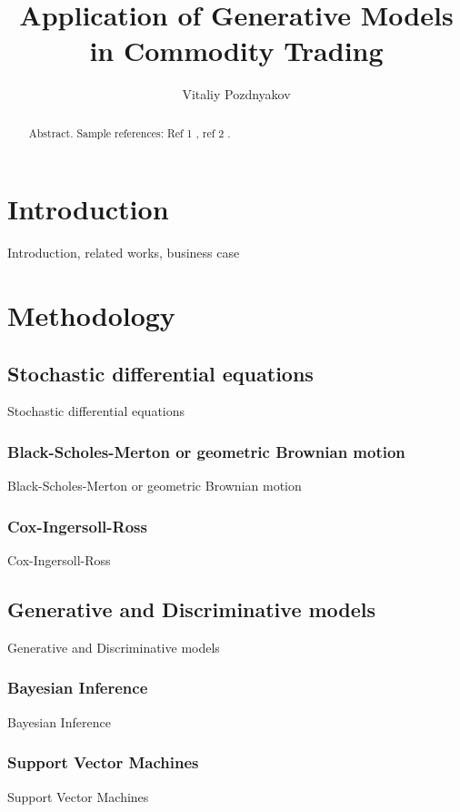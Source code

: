 \documentclass{article}
\title{Application of Generative Models \\ in Commodity Trading}
\author{Vitaliy Pozdnyakov}
\date{}
\begin{document}
\maketitle

\begin{abstract}
    Abstract. Sample references: Ref 1 \cite{renscen}, ref 2 \citet{jebara}.
\end{abstract}

\section{Introduction}
Introduction, related works, business case

\section{Methodology}

\subsection{Stochastic differential equations}

Stochastic differential equations

\subsubsection{Black-Scholes-Merton or geometric Brownian motion}
Black-Scholes-Merton or geometric Brownian motion

\subsubsection{Cox-Ingersoll-Ross}
Cox-Ingersoll-Ross

\subsection{Generative and Discriminative models}
Generative and Discriminative models

\subsubsection{Bayesian Inference}
Bayesian Inference

\subsubsection{Support Vector Machines}
Support Vector Machines
\end{document}
